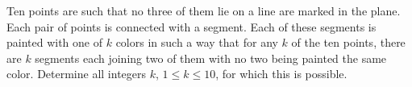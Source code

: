 Ten points are such that no three of them lie on a line are marked in the plane. Each pair of points is connected with a segment. Each of these segments is painted with one of $k$ colors in such a way that for any $k$ of the ten points, there are $k$ segments each joining two of them with no two being painted the same color. Determine all integers $k$, $1 \leq k \leq 10$, for which this is possible.

